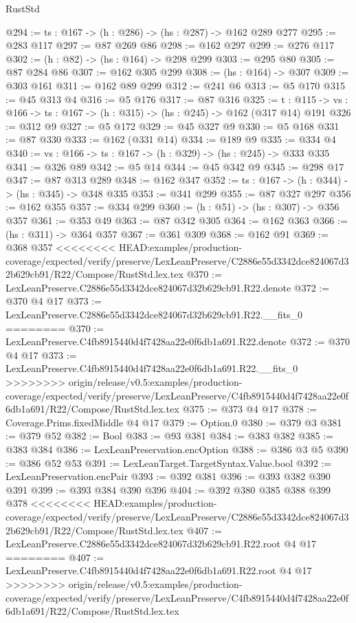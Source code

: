 \begin{lexlean}{RustStd}
\begin{coremodule}
{\begin{coremodule}
@294 := {ts : @167} -> (h : @286) -> (hs : @287) -> @162 @289 @277
@295 := @283 @117
@297 := @87 @269 @86
@298 := @162 @297
@299 := @276 @117
@302 := (h : @82) -> (hs : @164) -> @298 @299
@303 := @295 @80
@305 := @87 @284 @86
@307 := @162 @305 @299
@308 := (hs : @164) -> @307
@309 := @303 @161
@311 := @162 @89 @299
@312 := @241 @6
@313 := @5 @170
@315 := @45 @313 @4
@316 := @5 @176
@317 := @87 @316
@325 := {t : @115} ->
  {vs : @166} -> {ts : @167} -> (h : @315) -> (hs : @245) -> @162 (@317 @14) @191
@326 := @312 @9
@327 := @5 @172
@329 := @45 @327 @9
@330 := @5 @168
@331 := @87 @330
@333 := @162 (@331 @14)
@334 := @189 @9
@335 := @334 @4
@340 := {vs : @166} -> {ts : @167} -> (h : @329) -> (hs : @245) -> @333 @335
@341 := @326 @89
@342 := @5 @14
@344 := @45 @342 @9
@345 := @298 @17
@347 := @87 @313 @289
@348 := @162 @347
@352 := {ts : @167} -> (h : @344) -> (hs : @345) -> @348 @335
@353 := @341 @299
@355 := @87 @327 @297
@356 := @162 @355
@357 := @334 @299
@360 := (h : @51) -> (hs : @307) -> @356 @357
@361 := @353 @49
@363 := @87 @342 @305
@364 := @162 @363
@366 := (hs : @311) -> @364 @357
@367 := @361 @309
@368 := @162 @91
@369 := @368 @357
<<<<<<<< HEAD:examples/production-coverage/expected/verify/preserve/LexLeanPreserve/C2886e55d3342dce824067d32b629cb91/R22/Compose/RustStd.lex.tex
@370 := LexLeanPreserve.C2886e55d3342dce824067d32b629cb91.R22.denote
@372 := @370 @4 @17
@373 := LexLeanPreserve.C2886e55d3342dce824067d32b629cb91.R22.__fits_0
========
@370 := LexLeanPreserve.C4fb8915440d4f7428aa22e0f6db1a691.R22.denote
@372 := @370 @4 @17
@373 := LexLeanPreserve.C4fb8915440d4f7428aa22e0f6db1a691.R22.__fits_0
>>>>>>>> origin/release/v0.5:examples/production-coverage/expected/verify/preserve/LexLeanPreserve/C4fb8915440d4f7428aa22e0f6db1a691/R22/Compose/RustStd.lex.tex
@375 := @373 @4 @17
@378 := Coverage.Prims.fixedMiddle @4 @17
@379 := Option.{0}
@380 := @379 @3
@381 := @379 @52
@382 := Bool
@383 := @93 @381
@384 := @383 @382
@385 := @383 @384
@386 := LexLeanPreservation.encOption
@388 := @386 @3 @5
@390 := @386 @52 @53
@391 := LexLeanTarget.TargetSyntax.Value.bool
@392 := LexLeanPreservation.encPair
@393 := @392 @381
@396 := @393 @382 @390 @391
@399 := @393 @384 @390 @396
@404 := @392 @380 @385 @388 @399 @378
<<<<<<<< HEAD:examples/production-coverage/expected/verify/preserve/LexLeanPreserve/C2886e55d3342dce824067d32b629cb91/R22/Compose/RustStd.lex.tex
@407 := LexLeanPreserve.C2886e55d3342dce824067d32b629cb91.R22.root @4 @17
========
@407 := LexLeanPreserve.C4fb8915440d4f7428aa22e0f6db1a691.R22.root @4 @17
>>>>>>>> origin/release/v0.5:examples/production-coverage/expected/verify/preserve/LexLeanPreserve/C4fb8915440d4f7428aa22e0f6db1a691/R22/Compose/RustStd.lex.tex

\end{coremodule}}
\end{coremodule}
\end{lexlean}
